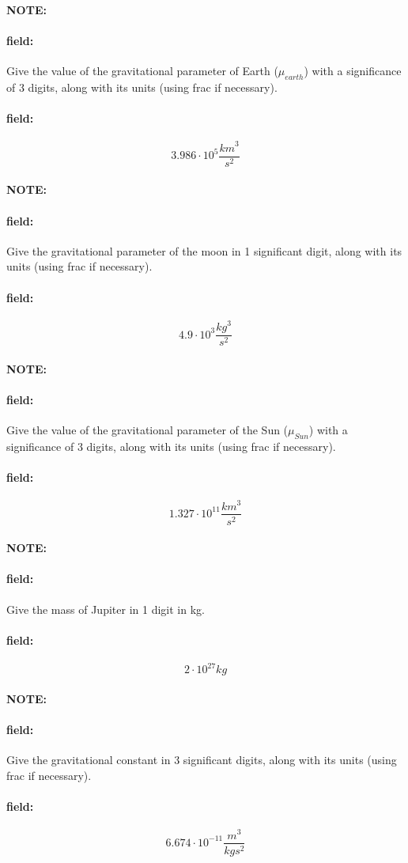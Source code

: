 \documentclass[12pt]{article}
\newenvironment{note}{\paragraph{NOTE:}}{}
\newenvironment{field}{\paragraph{field:}}{}
\begin{document}
\begin{note}
   \begin{field}
       Give the value of the gravitational parameter of Earth (\(\mu_{earth}\)) with a significance of 3 digits, along with its units (using frac if necessary).
   \end{field}
   \begin{field}
		\[
			3.986\cdot10^5\frac{{km}^3}{s^2}
		\]
   \end{field}
\end{note}
\begin{note}
   \begin{field}
       Give the gravitational parameter of the moon in 1 significant digit, along with its units (using frac if necessary).
   \end{field}
   \begin{field}
		\[
			4.9\cdot10^{3}\frac{{kg}^3}{s^2}
		\]
   \end{field}
\end{note}
\begin{note}
   \begin{field}
       Give the value of the gravitational parameter of the Sun (\(\mu_{Sun}\)) with a significance of 3 digits, along with its units (using frac if necessary).
   \end{field}
   \begin{field}
		\[
			1.327\cdot10^{11}\frac{km^3}{s^2}
		\]
   \end{field}
\end{note}

\begin{note}
   \begin{field}
       Give the mass of Jupiter in 1 digit in kg.
   \end{field}
   \begin{field}
		\[
			2\cdot10^{27}kg
		\]
   \end{field}
\end{note}

\begin{note}
   \begin{field}
       Give the gravitational constant in 3 significant digits, along with its units (using frac if necessary).
   \end{field}
   \begin{field}
		\[
			6.674\cdot10^{-11}\frac{m^3}{kg s^2}
		\]
   \end{field}
\end{note}
\end{document}
